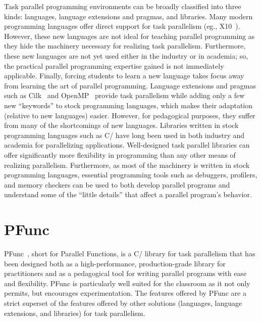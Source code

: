 \documentclass[9pt,twocolumn,letter]{article}
\begin{document}
Task parallel programming environments can be broadly classified into three
kinds: languages, language extensions and pragmas, and libraries.
Many modern programming languages offer direct support for task parallelism
(eg., X10~\cite{Charles:2005p1232}).
%
However, these new languages are not ideal for teaching parallel programming as
they hide the machinery necessary for realizing task parallelism.
%
Furthermore, these new languages are not yet used either in the industry or in
academia; so, the practical parallel programming expertise gained is not
immediately applicable.
%
Finally, forcing students to learn a new language takes focus away from
learning the art of parallel programming.
Language extensions and pragmas such as Cilk~\cite{FrigoLeRa98} and
OpenMP~\cite{kn:omp_30} provide task parallelism while adding only a few new
``keywords'' to stock programming languages, which makes their adaptation
(relative to new languages) easier.
%
However, for pedagogical purposes, they suffer from many of the shortcomings of
new languages.
Libraries written in stock programming languages such as C/\Cpp{} have long 
been used in both industry and academia for parallelizing applications.
%
Well-designed task parallel libraries can offer significantly more
flexibility in programming than any other means of realizing
parallelism.
%
Furthermore, as most of the machinery is written in stock programming
languages, essential programming tools such as debuggers, profilers, and memory
checkers can be used to both develop parallel programs and understand some of
the ``little details'' that affect a parallel program's behavior.

%
%
%
\section{PFunc}
\label{sec:pfunc}
PFunc~\cite{kambadur09:pfunc}, short for Parallel Functions, is a C/\Cpp{}
library for task parallelism that has been designed both as a
high-performance, production-grade library for practitioners and as a
pedagogical tool for writing parallel programs with ease and flexibility.
%
PFunc is particularly well suited for the classroom as it not only permits, but
encourages experimentation.
%
The features offered by PFunc are a strict superset of the features offered by
other solutions (languages, language extensions, and libraries) for task
parallelism.
\end{document}
